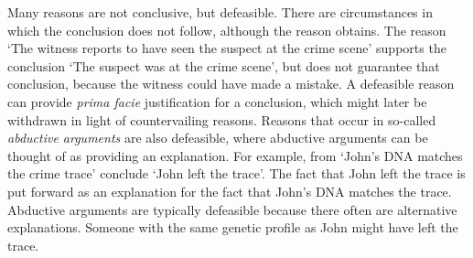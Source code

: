 \documentclass[10pt]{article}
\begin{document}
Many reasons are not conclusive, but defeasible. There are circumstances in which the conclusion does not follow, although the reason obtains. The reason `The witness reports to have seen the suspect at the crime scene' supports the conclusion `The suspect was at the crime scene', but does not guarantee that conclusion, because 
the witness could have made a mistake. A defeasible reason can provide \textit{prima facie} justification for a conclusion, which might later 
be withdrawn in light of countervailing reasons.
%
%
%
Reasons that occur in so-called \textit{abductive arguments} are also defeasible, where 
abductive arguments can be thought of as providing an explanation. %
For example, from `John's DNA matches the crime trace' conclude `John left the trace'.
The fact that John left the trace is put forward as an explanation for the fact that John's DNA matches the trace. 
Abductive arguments are typically defeasible because there often are alternative explanations. %
Someone with the same genetic profile as John might have left the trace. 

\end{document}

